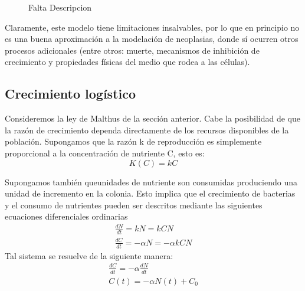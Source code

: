 \begin{figure}[!ht]
\begin{center}
\end{center}\vspace*{-0.6cm}
\caption[Imagen de Oncogenes. Falta poner leyenda]{Falta Descripcion}
\label{fig-malthus}
\end{figure}

Claramente, este modelo tiene limitaciones insalvables, por lo que en principio no es una buena aproximación a la modelación de neoplasias, donde sí ocurren otros procesos adicionales (entre otros: muerte, mecanismos de inhibición de crecimiento y propiedades físicas del medio que rodea a las células).

\subsection{Crecimiento logístico}
Consideremos la ley de Malthus de la sección anterior. Cabe la posibilidad de que la razón de crecimiento dependa directamente de los recursos disponibles de la población. Supongamos que la razón k de reproducción es simplemente proporcional a la concentración de nutriente C, esto es:
\begin{equation}
    K(C) = kC
\end{equation}

Supongamos también queunidades de nutriente son consumidas produciendo una unidad de incremento en la colonia. Esto implica que el crecimiento de bacterias y el consumo de nutrientes pueden ser descritos mediante las siguientes ecuaciones diferenciales ordinarias
\begin{equation}
    \begin{split} %
        \frac{dN}{dt} = kN = kCN\\
        \frac{dC}{dt} = -\alpha N = -\alpha k CN
    \end{split}
\end{equation}
Tal sistema se resuelve de la siguiente manera:
\begin{equation}
    \begin{split}
        \frac{dC}{dt} = -\alpha \frac{dN}{dt}\\
        C(t) = -\alpha N(t) + C_{0}
    \end{split}
\end{equation}
 

